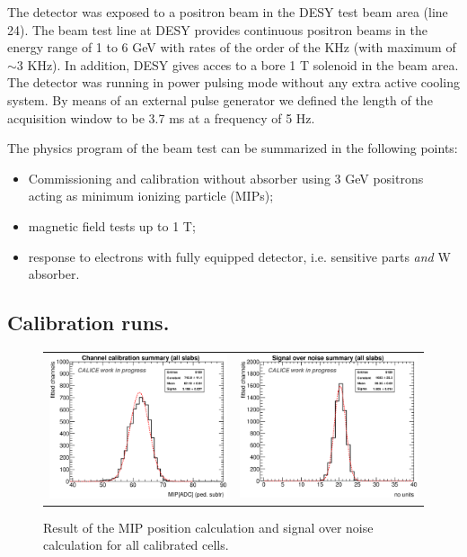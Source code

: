 \documentclass[a4paper,11pt]{article}
\begin{document}
The detector was exposed to a positron beam in the DESY test beam area (line 24).
The beam test line at DESY provides continuous positron beams in the energy range of 1 to 6 GeV with
rates of the order of the KHz (with maximum of $\sim 3$ KHz). In addition, DESY gives acces to a bore 1 T solenoid in the beam area. 
The detector was running in power pulsing mode without any extra active cooling system.
By means of an external pulse generator we defined the length of the acquisition window to be
3.7 ms at a frequency of 5 Hz. 

The physics program of the beam test can be summarized in the following points:

\begin{itemize}
\item Commissioning and calibration without absorber using 3 GeV positrons acting as minimum ionizing particle (MIPs);
\item magnetic field tests up to 1 T;
\item response to electrons with fully equipped detector, i.e. sensitive parts {\it and} W absorber.
\end{itemize}

\subsection{Calibration runs.}

\begin{figure}[!t]
  \centering
  \begin{tabular}{ll}
    \includegraphics[width=2.6in]{figures/MIPsummary_title.eps} & \includegraphics[width=2.6in]{figures/SNsummary_title.eps}
  \end{tabular}
\caption{Result of the MIP position calculation and signal over noise calculation for all calibrated cells.}
\label{mipandSN}
\end{figure}
  
\end{document}
